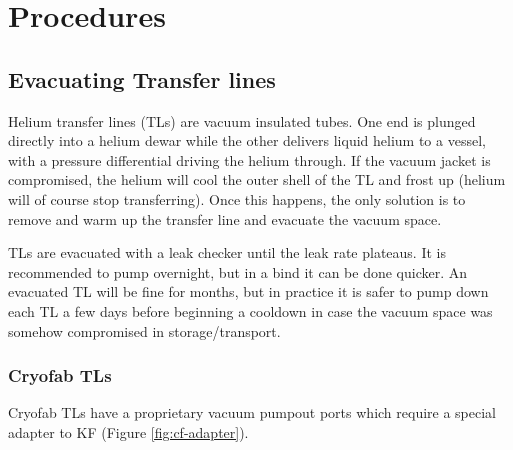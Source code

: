 \chapter{Procedures} 
\label{procedures}  
\section{Evacuating Transfer lines}
Helium transfer lines (TLs) are vacuum insulated tubes.  One end is plunged directly into a helium dewar while the other delivers liquid helium to a vessel, with a pressure differential driving the helium through.  If the vacuum jacket is compromised, the helium will cool the outer shell of the TL and frost up (helium will of course stop transferring).  Once this happens, the only solution is to remove and warm up the transfer line and evacuate the vacuum space.


TLs are evacuated with a leak checker until the leak rate plateaus.  It is recommended to pump overnight, but in a bind it can be done quicker.  An evacuated TL will be fine for months, but in practice it is safer to pump down each TL a few days before beginning a cooldown in case the vacuum space was somehow compromised in storage/transport.


\subsection{Cryofab TLs}

Cryofab TLs have a proprietary vacuum pumpout ports which require a special adapter to KF (Figure \ref{fig:cf-adapter}).

